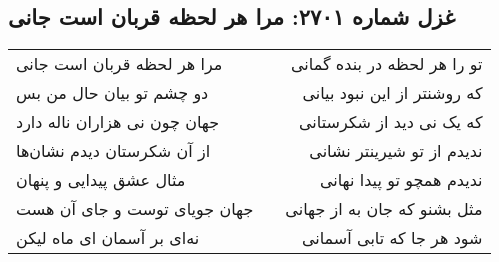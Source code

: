 \begin{center}
\section*{غزل شماره ۲۷۰۱: مرا هر لحظه قربان است جانی}
\label{sec:2701}
\begin{longtable}{l p{0.5cm} r}
مرا هر لحظه قربان است جانی
&&
تو را هر لحظه در بنده گمانی
\\
دو چشم تو بیان حال من بس
&&
که روشنتر از این نبود بیانی
\\
جهان چون نی هزاران ناله دارد
&&
که یک نی دید از شکرستانی
\\
از آن شکرستان دیدم نشان‌ها
&&
ندیدم از تو شیرینتر نشانی
\\
مثال عشق پیدایی و پنهان
&&
ندیدم همچو تو پیدا نهانی
\\
جهان جویای توست و جای آن هست
&&
مثل بشنو که جان به از جهانی
\\
نه‌ای بر آسمان ای ماه لیکن
&&
شود هر جا که تابی آسمانی
\\
\end{longtable}
\end{center}
